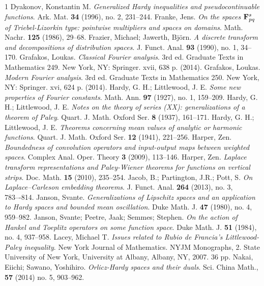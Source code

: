 \documentclass[a4paper, leqno, 10pt]{amsart}
\numberwithin{equation}{section}
\begin{document}
\begin{thebibliography}{1}
%
 Dyakonov, Konstantin M. {\it Generalized Hardy inequalities and pseudocontinuable functions}. Ark. Mat. {\bf 34} (1996), no. 2, 231--244. 
%
 {Franke, Jens}. {\it On the spaces ${\bf F}_{pq}^s$ of Triebel-Lizorkin type: pointwise  multipliers and spaces on domains}. Math. Nachr. {\bf 125} (1986), 29--68.
%
 Frazier, Michael; Jawerth, Bj\"orn. {\it A discrete transform and decompositions of distribution spaces}. J. Funct. Anal. {\bf 93} (1990), no. 1, 34--170. 
%
 Grafakos, Loukas. {\it
Classical Fourier analysis}. 3rd ed. Graduate Texts in Mathematics 249. New York, NY: Springer. xvii, 638 p. (2014). 
%
 Grafakos, Loukas. {\it
Modern Fourier analysis}. 3rd ed. Graduate Texts in Mathematics 250. New York, NY: Springer. xvi, 624 p. (2014). 
%
 Hardy, G. H.;  Littlewood, J. E. {\it Some new properties of Fourier constants}. Math. Ann. {\bf 97}  (1927), no. 1, 159--209.
%
 Hardy, G. H.; Littlewood, J. E. {\it Notes on the theory of series (XX): generalizations of a theorem of Paley}. Quart. J. Math. Oxford Ser. {\bf 8} (1937), 161--171.
%
 Hardy, G. H.; Littlewood, J. E. {\it Theorems concerning mean values of analytic or harmonic functions}. Quart. J. Math. Oxford Ser. {\bf 12} (1941), 221--256. 
%
 Harper, Zen. {\it Boundedness of convolution operators and input-output maps between weighted spaces}. Complex Anal. Oper. Theory {\bf 3} (2009), 113--146.
%
 Harper, Zen. {\it Laplace transform representations and Paley-Wiener theorems for functions on vertical strips}. Doc. Math. {\bf 15} (2010), 235--254.
%
 Jacob, B.; Partington, J.R.; Pott, S.  {\it On Laplace–Carleson embedding theorems}. J. Funct. Anal. {\bf 264} (2013), no. 3, 783–-814.
%
 Janson, Svante. {\it Generalizations of Lipschitz spaces and an application to Hardy spaces and bounded mean oscillation}. Duke Math. J. {\bf 47} (1980), no. 4, 959--982.
%
 Janson, Svante; Peetre, Jaak; Semmes; Stephen. {\it On the action of Hankel and Toeplitz operators on some function space}. Duke Math. J. {\bf 51} (1984), no. 4, 937--958.
%
 Lacey, Michael T. {\it Issues related to Rubio de Francia's Littlewood-Paley inequality}. New York Journal of Mathematics. NYJM Monographs, 2. State University of New York, University at Albany, Albany, NY, 2007. 36 pp. 
%
 Nakai, Eiichi; Sawano, Yoshihiro. {\it{Orlicz-{H}ardy spaces and their duals}}. Sci. China Math., {\bf 57} (2014) no. 5, 903--962.

\end{thebibliography}
\end{document}

